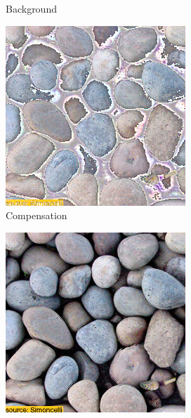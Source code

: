 \begin{figure}[]
\begin{subfigure}{\textwidth}
\begin{subfigure}{0.24\textwidth}
            \caption*{Background}
        \end{subfigure}
        \hfill
        \begin{subfigure}{0.24\textwidth}
            \centering
            \includegraphics[width=\textwidth]{images/04-experiment01/pebbles/1000/threshold_im.jpg}
            \caption*{Compensation}
        \end{subfigure}
        \hfill
        \begin{subfigure}{0.24\textwidth}
            \centering
            \includegraphics[width=\textwidth]{images/04-experiment01/pebbles/1000/threshold_proj.jpg}

\end{subfigure}
\end{subfigure}
\end{figure}
